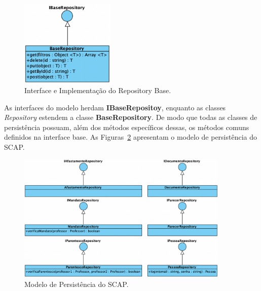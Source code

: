 \begin{figure}[h!]
    \centering
    \includegraphics[width=0.4\textwidth]{figuras/fig-modelo-persist-base.png}
    \caption{Interface e Implementação do Repository Base.}
    \label{fig-modelo-persist-base}
\end{figure}


As interfaces do modelo herdam \textbf{IBaseRepositoy}, enquanto as classes \textit{Repository} estendem a
classe \textbf{BaseRepository}. De modo que todas as classes de persistência possuam, além dos métodos
específicos dessas, os métodos comuns definidos na interface base. As Figuras~\ref{fig-modelo-persist}
apresentam o modelo de persistência do SCAP.

\begin{figure}[h!]
    \centering
    \includegraphics[width=0.9\textwidth]{figuras/fig-modelo-persist.png}
    \caption{Modelo de Persistência do SCAP.}
    \label{fig-modelo-persist}
\end{figure}



